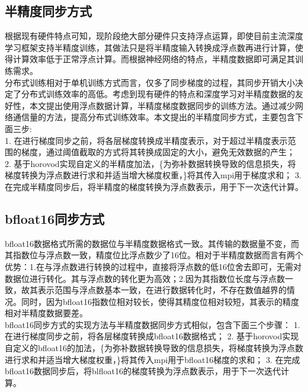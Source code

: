 \subsection{半精度同步方式}
根据现有硬件特点可知，现阶段绝大部分硬件只支持浮点运算，即使目前主流深度学习框架支持半精度训练，其做法只是将半精度输入转换成浮点数再进行计算，使得计算效率低于正常浮点计算。而根据神经网络的特点，半精度数据即可满足其训练需求。\\
分布式训练相对于单机训练方式而言，仅多了同步梯度的过程，其同步开销大小决定了分布式训练效率的高低。考虑到现有硬件的特点和深度学习对半精度数据的友好性，本文提出使用浮点数据计算，半精度梯度数据同步的训练方法。通过减少网络通信量的方法，提高分布式训练效率。本文提出的半精度同步方式，主要包含下面三步:\\
1. 在进行梯度同步之前，将各层梯度转换成半精度表示，对于超过半精度表示范围的梯度，通过阈值截取的方式将其转换成固定的大小，避免无效数据的产生；
2. 基于horovod实现自定义的半精度加法，\{为弥补数据转换导致的信息损失，将梯度转换为浮点数进行求和并适当增大梯度权重，\}将其传入mpi用于梯度求和；
3. 在完成半精度同步后，将半精度的梯度转换为浮点数表示，用于下一次迭代计算。

\subsection{bfloat16同步方式}
bfloat16数据格式所需的数据位与半精度数据格式一致。其传输的数据量不变，而其指数位与浮点数一致，精度位比浮点数少了16位。相对于半精度数据而言有两个优势：1.在与浮点数进行转换的过程中，直接将浮点数的低16位舍去即可，无需对数据位进行转化。其与浮点数的转化更为高效；2.因为其指数位长度与浮点数一致，故其表示范围与浮点数基本一致，在进行数据转化时，不存在数值越界的情况。同时，因为bfloat16指数位相对较长，使得其精度位相对较短，其表示的精度相对半精度数据要差。\\
bfloat16同步方式的实现方法与半精度数据同步方式相似，包含下面三个步骤：
1. 在进行梯度同步之前，将各层梯度转换成bfloat16数据格式；
2. 基于horovod实现自定义的bfloat16的加法，\{为弥补数据转换导致的信息损失，将梯度转换为浮点数进行求和并适当增大梯度权重，\}将其传入mpi用于bfloat16梯度的求和；
3. 在完成bfloat16数据同步后，将blfloat16的梯度转换为浮点数表示，用于下一次迭代计算。
